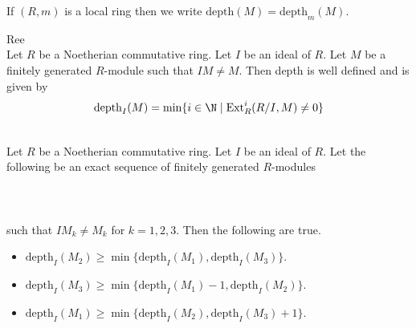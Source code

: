 \documentclass[a4paper]{article}
\begin{document}
If $(R,m)$ is a local ring then we write $\text{depth}(M)=\text{depth}_m(M)$. 

\begin{thm}{Ree}{}\\
Let $R$ be a Noetherian commutative ring. Let $I$ be an ideal of $R$. Let $M$ be a finitely generated $R$-module such that $IM\neq M$. Then depth is well defined and is given by $$\text{depth}_I(M)=\min\{i\in\N\;|\;\text{Ext}_R^i(R/I,M)\neq 0\}$$
\end{thm}

\begin{prp}{}{}\\
Let $R$ be a Noetherian commutative ring. Let $I$ be an ideal of $R$. Let the following be an exact sequence of finitely generated $R$-modules \\~\\
\\~\\
such that $IM_k\neq M_k$ for $k=1,2,3$. Then the following are true. 
\begin{itemize}
\item $\text{depth}_I(M_2)\geq\min\{\text{depth}_I(M_1),\text{depth}_I(M_3)\}$. 
\item $\text{depth}_I(M_3)\geq\min\{\text{depth}_I(M_1)-1,\text{depth}_I(M_2)\}$. 
\item $\text{depth}_I(M_1)\geq\min\{\text{depth}_I(M_2),\text{depth}_I(M_3)+1\}$. 
\end{itemize}
\end{prp}
\end{document}
